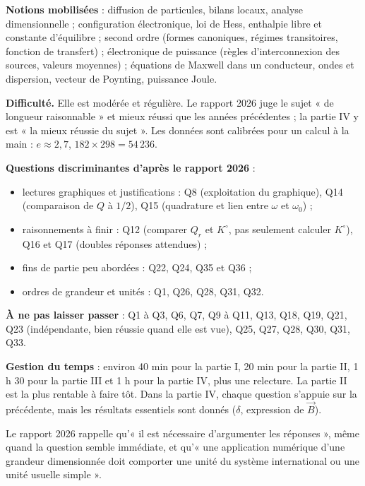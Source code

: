 \documentclass[11pt,a4paper]{article}
\providecommand{\tightlist}{\setlength{\itemsep}{0pt}\setlength{\parskip}{0pt}}
\begin{document}
\textbf{Notions mobilisées} : diffusion de particules, bilans locaux, analyse dimensionnelle ; configuration électronique, loi de Hess, enthalpie libre et constante d'équilibre ; second ordre (formes canoniques, régimes transitoires, fonction de transfert) ; électronique de puissance (règles d'interconnexion des sources, valeurs moyennes) ; équations de Maxwell dans un conducteur, ondes et dispersion, vecteur de Poynting, puissance Joule.

\textbf{Difficulté.} Elle est modérée et régulière. Le rapport 2026 juge le sujet « de longueur raisonnable » et mieux réussi que les années précédentes ; la partie IV y est « la mieux réussie du sujet ». Les données sont calibrées pour un calcul à la main : \(e\approx2{,}7\), \(182\times298=54\,236\).

\textbf{Questions discriminantes d'après le rapport 2026} :

\begin{itemize}
\tightlist
\item
  lectures graphiques et justifications : Q8 (exploitation du graphique), Q14 (comparaison de \(Q\) à \(1/2\)), Q15 (quadrature et lien entre \(\omega\) et \(\omega_0\)) ;
\item
  raisonnements à finir : Q12 (comparer \(Q_r\) et \(K^\circ\), pas seulement calculer \(K^\circ\)), Q16 et Q17 (doubles réponses attendues) ;
\item
  fins de partie peu abordées : Q22, Q24, Q35 et Q36 ;
\item
  ordres de grandeur et unités : Q1, Q26, Q28, Q31, Q32.
\end{itemize}

\textbf{À ne pas laisser passer} : Q1 à Q3, Q6, Q7, Q9 à Q11, Q13, Q18, Q19, Q21, Q23 (indépendante, bien réussie quand elle est vue), Q25, Q27, Q28, Q30, Q31, Q33.

\textbf{Gestion du temps} : environ 40 min pour la partie I, 20 min pour la partie II, 1 h 30 pour la partie III et 1 h pour la partie IV, plus une relecture. La partie II est la plus rentable à faire tôt. Dans la partie IV, chaque question s'appuie sur la précédente, mais les résultats essentiels sont donnés (\(\delta\), expression de \(\vec B\)).

\begin{jury}

Le rapport 2026 rappelle qu'« il est nécessaire d'argumenter les réponses », même quand la question semble immédiate, et qu'« une application numérique d'une grandeur dimensionnée doit comporter une unité du système international ou une unité usuelle simple ».

\end{jury}
\end{document}
